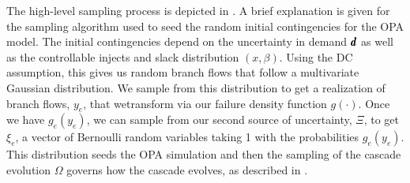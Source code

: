 The high-level sampling process is depicted in  . A brief explanation is given for the sampling algorithm used to seed the random initial contingencies for the OPA model.  The initial contingencies depend on the uncertainty in demand $\pmb{d}$ as well as the controllable injects and slack distribution $(x,\beta)$.  Using the DC assumption, this gives us random branch flows that follow a multivariate Gaussian distribution.  We sample from this distribution to get a realization of branch flows, $y_e$, that wetransform via our failure density function $g(\cdot)$.  Once we have $g_e(y_e)$, we can sample from our second source of uncertainty, $\Xi$, to get  $\xi_e$, a vector of Bernoulli random variables taking 1 with the probabilities $g_e(y_e)$.  This distribution seeds the OPA simulation and then the sampling of the cascade evolution $\Omega$  governs how the cascade evolves, as described in .

